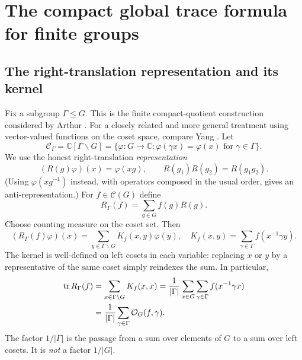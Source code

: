 \documentclass[12pt]{article}
\theoremstyle{remark}
\newcommand{\C}{\mathbb C}
\newcommand{\tr}{\operatorname{tr}}
\newcommand{\cG}{\mathcal C(G)}
\newcommand{\cH}{\mathcal C}
\newcommand{\Orb}{\mathcal O}
\begin{document}
\section{The compact global trace formula for finite groups}
\subsection{The right-translation representation and its kernel}
Fix a subgroup $\Gamma\leq G$.  This is the finite
compact-quotient construction considered by Arthur
\cite[Example~2]{ArthurHecke1989}. For a closely related and
more general treatment using vector-valued functions on the coset
space, compare Yang \cite{Yang2006}.  Let
\[
 \cH_\Gamma=\C[\Gamma\backslash G]
 =\{\varphi:G\to\C:\varphi(\gamma x)=\varphi(x)
                    \text{ for }\gamma\in\Gamma\}.
\]
We use the honest right-translation \emph{representation}
\begin{equation}\label{eq:Rh}
 (R(g)\varphi)(x)=\varphi(xg),\qquad
 R(g_1)R(g_2)=R(g_1g_2).
\end{equation}
(Using $\varphi(xg^{-1})$ instead, with operators composed in the
usual order, gives an anti-representation.) For $f\in\cG$ define
\[
 R_\Gamma(f)=\sum_{g\in G}f(g)R(g).
\]
Choose counting measure on the coset set.  Then
\begin{equation}\label{eq:kernel}
 (R_\Gamma(f)\varphi)(x)
  =\sum_{y\in\Gamma\backslash G} K_f(x,y)\varphi(y),\quad
 K_f(x,y)=\sum_{\gamma\in\Gamma}f(x^{-1}\gamma y).
\end{equation}
The kernel is well-defined on left cosets in each variable:
replacing $x$ or $y$ by a representative of the same coset
simply reindexes the sum. In particular,
\begin{align}
 \tr R_\Gamma(f)
 &=\sum_{x\in\Gamma\backslash G} K_f(x,x)
  =\frac1{|\Gamma|}\sum_{x\in G}\sum_{\gamma\in\Gamma}
                                  f(x^{-1}\gamma x)\notag\\
 &=\frac1{|\Gamma|}\sum_{\gamma\in\Gamma}
                                  \Orb_G(f,\gamma).
 \label{eq:rawgeo}
\end{align}
The factor $1/|\Gamma|$ is the passage from a sum over elements
of $G$ to a sum over left cosets. It is \emph{not} a factor $1/|G|$.
\end{document}
